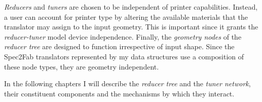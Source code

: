 \emph{Reducers} and \emph{tuners} are chosen to be independent of printer capabilities.
Instead, a user can account for printer type by altering the available materials
that the translator may assign to the input geometry.
This is important since it grants the \emph{reducer-tuner} model device independence.
Finally, the \emph{geometry nodes} of the \emph{reducer tree} are designed to function irrespective of input shape.
Since the Spec2Fab translators represented by my data structures use a composition of these node types,
they are geometry independent. 
	
In the following chapters I will describe the \emph{reducer tree} and the \emph{tuner network}, their constituent components and the mechanisms by which they interact. 
